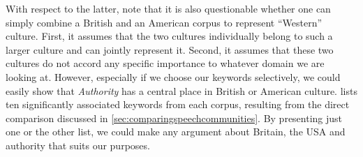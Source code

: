 With respect to the latter, note that it is also questionable whether one can simply combine a British and an American  corpus to represent ``Western'' culture.  First, it assumes that the two cultures individually belong to such a larger culture and can jointly represent it. Second, it assumes that these two cultures do not accord any specific importance to whatever domain we are looking at. However, especially if we choose our keywords  selectively, we could easily show that \textit{Authority} has a central place in British  or American  culture.   lists ten significantly associated  keywords from each corpus, resulting from the direct comparison discussed in \ref{sec:comparingspeechcommunities}. By presenting just one or the other list, we could make any argument about Britain, the USA and authority that suits our purposes.

